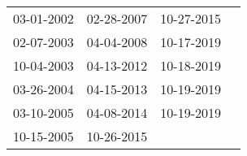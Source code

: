 \begin{supertabular}{llll}
 03-01-2002 &  02-28-2007 &  10-27-2015 \\
 02-07-2003 &  04-04-2008 &  10-17-2019 \\
 10-04-2003 &  04-13-2012 &  10-18-2019 \\
 03-26-2004 &  04-15-2013 &  10-19-2019 \\
 03-10-2005 &  04-08-2014 &  10-19-2019 \\
 10-15-2005 &  10-26-2015 &             \\
\end{supertabular}
